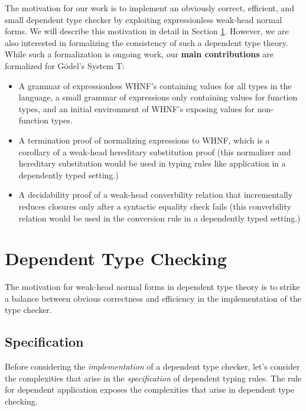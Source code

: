 \documentclass[preprint,authoryear]{sigplanconf}
\newcommand{\refsec}[1]{Section \ref{sec:#1}}
\begin{document}
The motivation for our work is to implement an obviously correct,
efficient, and small dependent type checker by exploiting
expressionless weak-head normal forms. We will describe this
motivation in detail in \refsec{motivation}. However, we are also
interested in formalizing the consistency of such a dependent type
theory. While such a formalization is ongoing work, our
{\bf main contributions} are formalized for G{\"o}del's System T:

\begin{itemize}
\item A grammar of expressionless WHNF's containing values for all
  types in the language, a small grammar of expressions only
  containing values for function types, and an initial environment of
  WHNF's exposing values for non-function types.
\item A termination proof of normalizing expressions to WHNF, which is
  a corollary of a weak-head hereditary substitution proof (this
  normalizer and hereditary substitution would be used in typing rules
  like application in a dependently typed setting.)
\item A decidability proof of a weak-head converbility relation that
  incrementally reduces closures only after a syntactic equality check
  fails (this converbility relation would be used in the conversion
  rule in a dependently typed setting.)
\end{itemize}


\section{Dependent Type Checking}
\label{sec:motivation}

The motivation for weak-head normal forms in dependent type theory is
to strike a balance between obvious correctness and efficiency in the
implementation of the type checker. 

\subsection{Specification}

Before considering the {\it implementation} of a dependent type checker,
let's consider the complexities that arise in the
{\it specification} of dependent typing rules.
The rule for dependent application exposes the complexities
that arise in dependent type checking.
\end{document}

